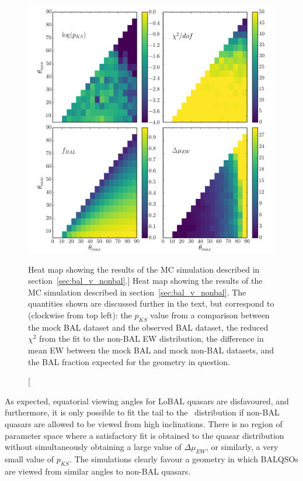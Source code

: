 \begin{figure} %
\centering
\includegraphics[width=1.0\textwidth]{figures/ewpaper/mesh4_ew_o3_max_sdss.png}
\caption
[Heat map showing the results of the MC simulation described in 
section~\ref{sec:bal_v_nonbal}.]
{
Heat map showing the results of the MC simulation described in 
section~\ref{sec:bal_v_nonbal}. The quantities shown are discussed 
further in the text, but correspond to (clockwise from top left):
the $p_{KS}$ value from a comparison between the mock BAL dataset
and the observed BAL dataset, the reduced $\chi^2$ from the fit to
the non-BAL EW distribution, the difference in mean EW between the 
mock BAL and mock non-BAL datasets, and the BAL fraction expected
for the geometry in question.
}
\label{fig:contour}
\end{figure} %

As expected, equatorial viewing angles for LoBAL quasars 
are disfavoured, and furthermore, it is only possible to fit
the tail to the \ewo\ distribution if non-BAL quasars are allowed 
to be viewed from high inclinations. There is no region of parameter
space where a satisfactory fit is obtained to the quasar distribution
without simultaneously obtaining a large value of $\Delta \mu_{EW}$, or similarly,
a very small value of $p_{KS}$. The simulations clearly favour a geometry in which 
BALQSOs are viewed from similar angles to non-BAL quasars.

